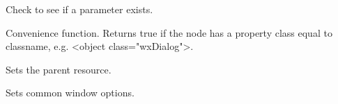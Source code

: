 \label{wxxmlresourcehandlerhasparam}


Check to see if a parameter exists.


\label{wxxmlresourcehandlerisofclass}


Convenience function. Returns true if the node has a property class equal to classname,
e.g. <object class="wxDialog">.


\label{wxxmlresourcehandlersetparentresource}


Sets the parent resource.


\label{wxxmlresourcehandlersetupwindow}


Sets common window options.

